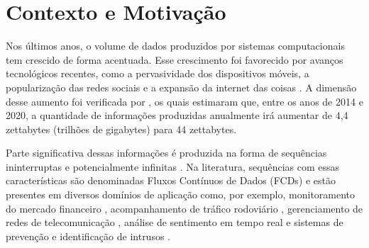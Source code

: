 \documentclass[msc, classic, a4paper]{ufbathesis}
\begin{document}

\tableofcontents

\listoffigures

\listoftables

\listofalgorithms

\mainmatter

% 
% 
% 
%

 \label{introducao}

\section{Contexto e Motivação}

Nos últimos anos, o volume de dados produzidos por sistemas computacionais tem crescido de forma acentuada.
%
Esse crescimento foi favorecido por avanços tecnológicos recentes, como
a pervasividade dos dispositivos móveis,
a popularização das redes sociais e
a expansão da internet das coisas \cite{Cohen:BigData:2009:MSN:1687553.1687576}.
%
A dimensão desse aumento foi verificada por ,
os quais estimaram que, entre os anos de 2014 e 2020,
a quantidade de informações produzidas anualmente irá aumentar de 4,4 zettabytes (trilhões de gigabytes) para 44 zettabytes.

Parte significativa dessas informações é produzida na forma de sequências ininterruptas e potencialmente infinitas \cite{Aggarwal:2006:DSM:1196418}.
%
Na literatura, sequências com essas características são denominadas Fluxos Contínuos de Dados (FCDs) e estão presentes em diversos domínios de aplicação como, por exemplo, monitoramento do mercado financeiro \cite{ZHOU:2015},
acompanhamento de tráfico rodoviário \cite{Wang:2015:EOV:2843092.2843464},
gerenciamento de redes de telecomunicação \cite{delattre2015method},
análise de sentimento em tempo real \cite{KRANJC2015187} e
sistemas de prevenção e identificação de intrusos \cite{KENKRE:PAI:COLACO:2015}.
\end{document}
